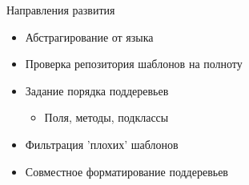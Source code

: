 \documentclass[sans]{beamer}
\begin{document}
\begin{frame}{Направления развития}
  \begin{itemize}
    \item Абстрагирование от языка
    \item Проверка репозитория шаблонов на полноту
    \item Задание порядка поддеревьев
      \begin{itemize}
        \item Поля, методы, подклассы
      \end{itemize}

    \item Фильтрация 'плохих' шаблонов
    \item Совместное форматирование поддеревьев
  \end{itemize}
\end{frame}
\end{document}
